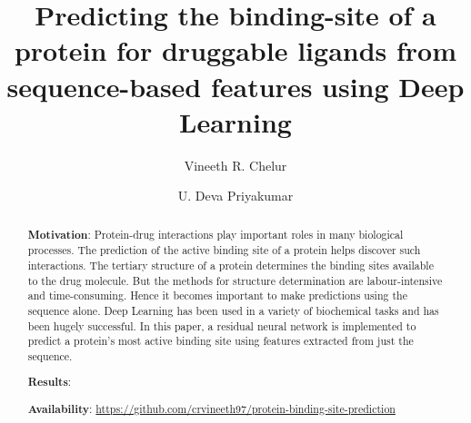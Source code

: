 \documentclass[journal=jacsat,manuscript=article]{achemso}
\author{Vineeth R. Chelur}
\author{U. Deva Priyakumar}
\affiliation[IIIT-H]
{Center for Computational Natural Sciences \& Bioinformatics, IIIT-H, Hyderabad}
\title[Predicting the binding-site of a protein for druggable ligands from sequence-based features using Deep Learning]
  {Predicting the binding-site of a protein for druggable ligands from sequence-based features using Deep Learning
  }
\begin{document}






\begin{abstract}
    \noindent\textbf{Motivation}: Protein-drug interactions play important roles in many biological processes. The prediction of the active binding site of a protein helps discover such interactions. The tertiary structure of a protein determines the binding sites available to the drug molecule. But the methods for structure determination are labour-intensive and time-consuming. Hence it becomes important to make predictions using the sequence alone. Deep Learning has been used in a variety of biochemical tasks and has been hugely successful. In this paper, a residual neural network is implemented to predict a protein's most active binding site using features extracted from just the sequence.

    \noindent\textbf{Results}:

    \noindent\textbf{Availability}: \href{https://github.com/crvineeth97/protein-binding-site-prediction}{https://github.com/crvineeth97/protein-binding-site-prediction}
\end{abstract}
\end{document}
